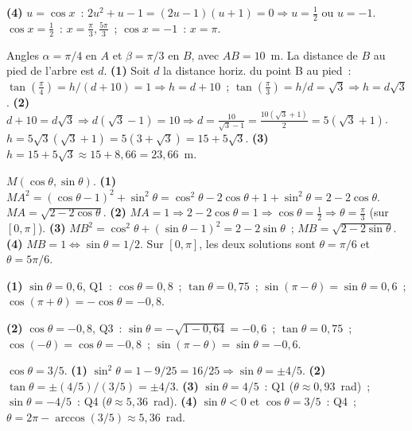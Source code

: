 \textbf{(4)} $u=\cos x$~: $2u^2+u-1=(2u-1)(u+1)=0\Rightarrow u=\frac{1}{2}$ ou $u=-1$.
$\cos x=\frac{1}{2}$~: $x=\frac{\pi}{3},\frac{5\pi}{3}$~; $\cos x=-1$~: $x=\pi$.


Angles $\alpha=\pi/4$ en $A$ et $\beta=\pi/3$ en $B$, avec $AB=10$~m.
La distance de $B$ au pied de l'arbre est $d$.
\textbf{(1)} Soit $d$ la distance horiz. du point B au pied~:
$\tan(\frac{\pi}{4})=h/(d+10)=1\Rightarrow h=d+10$~;
$\tan(\frac{\pi}{3})=h/d=\sqrt{3}\Rightarrow h=d\sqrt{3}$.
\textbf{(2)} $d+10=d\sqrt{3}\Rightarrow d(\sqrt{3}-1)=10\Rightarrow d=\frac{10}{\sqrt{3}-1}=\frac{10(\sqrt{3}+1)}{2}=5(\sqrt{3}+1)$.
$h=5\sqrt{3}(\sqrt{3}+1)=5(3+\sqrt{3})=15+5\sqrt{3}$.
\textbf{(3)} $h=15+5\sqrt{3}\approx15+8{,}66=23{,}66$~m.


$M(\cos\theta,\sin\theta)$.
\textbf{(1)} $MA^2=(\cos\theta-1)^2+\sin^2\theta=\cos^2\theta-2\cos\theta+1+\sin^2\theta=2-2\cos\theta$.
$MA=\sqrt{2-2\cos\theta}$.
\textbf{(2)} $MA=1\Rightarrow2-2\cos\theta=1\Rightarrow\cos\theta=\frac{1}{2}\Rightarrow\theta=\frac{\pi}{3}$ (sur $[0,\pi]$).
\textbf{(3)} $MB^2=\cos^2\theta+(\sin\theta-1)^2=2-2\sin\theta$~; $MB=\sqrt{2-2\sin\theta}$.
\textbf{(4)} $MB=1\Leftrightarrow\sin\theta=1/2$.
Sur $[0,\pi]$, les deux solutions sont $\theta=\pi/6$ et $\theta=5\pi/6$.


\textbf{(1)} $\sin\theta=0{,}6$, Q1~:
$\cos\theta=0{,}8$~; $\tan\theta=0{,}75$~;
$\sin(\pi-\theta)=\sin\theta=0{,}6$~;
$\cos(\pi+\theta)=-\cos\theta=-0{,}8$.

\textbf{(2)} $\cos\theta=-0{,}8$, Q3~:
$\sin\theta=-\sqrt{1-0{,}64}=-0{,}6$~; $\tan\theta=0{,}75$~;
$\cos(-\theta)=\cos\theta=-0{,}8$~;
$\sin(\pi-\theta)=\sin\theta=-0{,}6$.


$\cos\theta=3/5$.
\textbf{(1)} $\sin^2\theta=1-9/25=16/25\Rightarrow\sin\theta=\pm4/5$.
\textbf{(2)} $\tan\theta=\pm(4/5)/(3/5)=\pm4/3$.
\textbf{(3)} $\sin\theta=4/5$~: Q1 ($\theta\approx0{,}93$~rad)~;
$\sin\theta=-4/5$~: Q4 ($\theta\approx5{,}36$~rad).
\textbf{(4)} $\sin\theta<0$ et $\cos\theta=3/5$~: Q4~; $\theta=2\pi-\arccos(3/5)\approx5{,}36$~rad.

